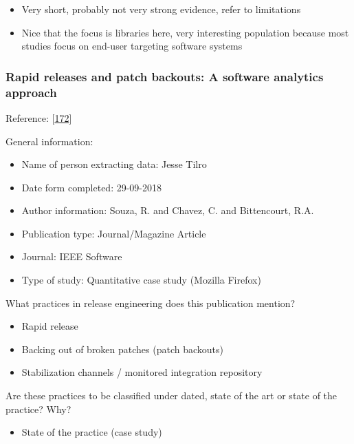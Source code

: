 \documentclass[]{book}
\providecommand{\tightlist}{%
  \setlength{\itemsep}{0pt}\setlength{\parskip}{0pt}}
\begin{document}
\begin{itemize}
\tightlist
\item
  Very short, probably not very strong evidence, refer to limitations
\item
  Nice that the focus is libraries here, very interesting population
  because most studies focus on end-user targeting software systems
\end{itemize}

\subsubsection{Rapid releases and patch backouts: A software analytics
approach}\label{rapid-releases-and-patch-backouts-a-software-analytics-approach}

Reference: {[}\protect\hyperlink{ref-souza2015a}{172}{]}

General information:

\begin{itemize}
\tightlist
\item
  Name of person extracting data: Jesse Tilro
\item
  Date form completed: 29-09-2018
\item
  Author information: Souza, R. and Chavez, C. and Bittencourt, R.A.
\item
  Publication type: Journal/Magazine Article
\item
  Journal: IEEE Software
\item
  Type of study: Quantitative case study (Mozilla Firefox)
\end{itemize}

What practices in release engineering does this publication mention?

\begin{itemize}
\tightlist
\item
  Rapid release
\item
  Backing out of broken patches (patch backouts)
\item
  Stabilization channels / monitored integration repository
\end{itemize}

Are these practices to be classified under dated, state of the art or
state of the practice? Why?

\begin{itemize}
\tightlist
\item
  State of the practice (case study)
\end{itemize}
\end{document}
